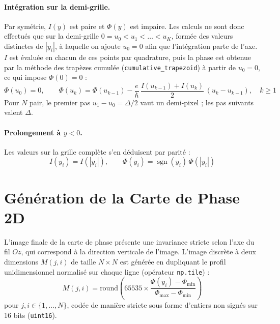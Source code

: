 \documentclass[11pt, a4paper]{article}
\begin{document}
\paragraph{Intégration sur la demi-grille.} Par symétrie, $I(y)$ est paire et $\Phi(y)$ est impaire. Les calculs ne sont donc effectués que sur la demi-grille $0 = u_0 < u_1 < \dots < u_K$, formée des valeurs distinctes de $|y_i|$, à laquelle on ajoute $u_0 = 0$ afin que l'intégration parte de l'axe. $I$ est évaluée en chacun de ces points par quadrature, puis la phase est obtenue par la méthode des trapèzes cumulée (\texttt{cumulative\_trapezoid}) à partir de $u_0 = 0$, ce qui impose $\Phi(0) = 0$ :
\begin{equation}
    \Phi(u_0) = 0, \qquad \Phi(u_k) = \Phi(u_{k-1}) - \frac{e}{\hbar}\,\frac{I(u_{k-1}) + I(u_k)}{2}\,(u_k - u_{k-1}), \quad k \geq 1
\end{equation}
Pour $N$ pair, le premier pas $u_1 - u_0 = \Delta/2$ vaut un demi-pixel ; les pas suivants valent $\Delta$.

\paragraph{Prolongement à $y < 0$.} Les valeurs sur la grille complète s'en déduisent par parité :
\begin{equation}
    I(y_i) = I(|y_i|), \qquad \Phi(y_i) = \operatorname{sgn}(y_i)\,\Phi(|y_i|)
\end{equation}

\section{Génération de la Carte de Phase 2D}
L'image finale de la carte de phase présente une invariance stricte selon l'axe du fil $Oz$, qui correspond à la direction verticale de l'image. L'image discrète à deux dimensions $M(j, i)$ de taille $N \times N$ est générée en dupliquant le profil unidimensionnel normalisé sur chaque ligne (opérateur \texttt{np.tile}) :
\begin{equation}
    M(j, i) = \text{round}\left( 65535 \times \frac{\Phi(y_i) - \Phi_{\text{min}}}{\Phi_{\text{max}} - \Phi_{\text{min}}} \right)
\end{equation}
pour $j, i \in \{1, \dots, N\}$, codée de manière stricte sous forme d'entiers non signés sur 16 bits (\texttt{uint16}).
\end{document}
